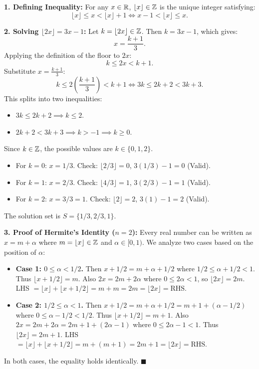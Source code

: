 \begin{solution}
\textbf{1. Defining Inequality:}
For any $x \in \mathbb{R}$, $\lfloor x \rfloor \in \mathbb{Z}$ is the unique integer satisfying:
\[
\lfloor x \rfloor \le x < \lfloor x \rfloor + 1 \iff x - 1 < \lfloor x \rfloor \le x.
\]

\textbf{2. Solving $\lfloor 2x \rfloor = 3x - 1$:}
Let $k = \lfloor 2x \rfloor \in \mathbb{Z}$. Then $k = 3x - 1$, which gives:
\[
x = \frac{k + 1}{3}.
\]
Applying the definition of the floor to $2x$:
\[
k \le 2x < k + 1.
\]
Substitute $x = \frac{k + 1}{3}$:
\[
k \le 2\left(\frac{k + 1}{3}\right) < k + 1 \iff 3k \le 2k + 2 < 3k + 3.
\]
This splits into two inequalities:
\begin{itemize}[leftmargin=1.5em,itemsep=1pt]
  \item $3k \le 2k + 2 \implies k \le 2$.
  \item $2k + 2 < 3k + 3 \implies k > -1 \implies k \ge 0$.
\end{itemize}
Since $k \in \mathbb{Z}$, the possible values are $k \in \{0, 1, 2\}$.
\begin{itemize}[leftmargin=1.5em,itemsep=1pt]
  \item For $k = 0$: $x = 1/3$. Check: $\lfloor 2/3 \rfloor = 0$, $3(1/3) - 1 = 0$ (Valid).
  \item For $k = 1$: $x = 2/3$. Check: $\lfloor 4/3 \rfloor = 1$, $3(2/3) - 1 = 1$ (Valid).
  \item For $k = 2$: $x = 3/3 = 1$. Check: $\lfloor 2 \rfloor = 2$, $3(1) - 1 = 2$ (Valid).
\end{itemize}
The solution set is $S = \{1/3, 2/3, 1\}$.

\textbf{3. Proof of Hermite's Identity ($n = 2$):}
Every real number can be written as $x = m + \alpha$ where $m = \lfloor x \rfloor \in \mathbb{Z}$ and $\alpha \in [0, 1)$.
We analyze two cases based on the position of $\alpha$:
\begin{itemize}[leftmargin=1.5em,itemsep=2pt]
  \item \textbf{Case 1: $0 \le \alpha < 1/2$.}
  Then $x + 1/2 = m + \alpha + 1/2$ where $1/2 \le \alpha + 1/2 < 1$.
  Thus $\lfloor x + 1/2 \rfloor = m$.
  Also $2x = 2m + 2\alpha$ where $0 \le 2\alpha < 1$, so $\lfloor 2x \rfloor = 2m$.
  LHS $= \lfloor x \rfloor + \lfloor x + 1/2 \rfloor = m + m = 2m = \lfloor 2x \rfloor = \text{RHS}$.
  \item \textbf{Case 2: $1/2 \le \alpha < 1$.}
  Then $x + 1/2 = m + \alpha + 1/2 = m + 1 + (\alpha - 1/2)$ where $0 \le \alpha - 1/2 < 1/2$.
  Thus $\lfloor x + 1/2 \rfloor = m + 1$.
  Also $2x = 2m + 2\alpha = 2m + 1 + (2\alpha - 1)$ where $0 \le 2\alpha - 1 < 1$.
  Thus $\lfloor 2x \rfloor = 2m + 1$.
  LHS $= \lfloor x \rfloor + \lfloor x + 1/2 \rfloor = m + (m + 1) = 2m + 1 = \lfloor 2x \rfloor = \text{RHS}$.
\end{itemize}
In both cases, the equality holds identically. \hfill $\blacksquare$
\end{solution}

